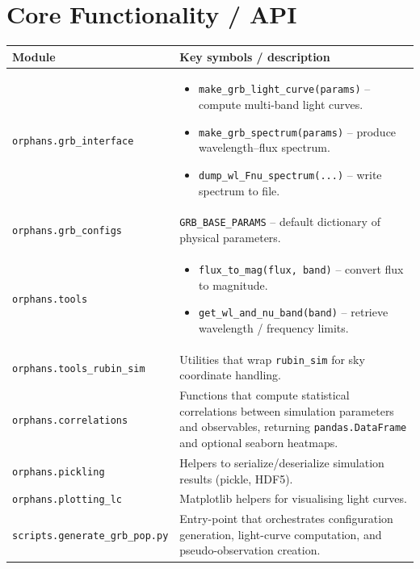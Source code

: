\documentclass{article}
\begin{document}
\section*{Core Functionality / API}
\begin{longtable}{p{}p{}}
\textbf{Module} & \textbf{Key symbols / description} \\ \hline
\texttt{orphans.grb\_interface} &
\begin{itemize}
  \item \texttt{make\_grb\_light\_curve(params)} – compute multi-band light curves.
  \item \texttt{make\_grb\_spectrum(params)} – produce wavelength–flux spectrum.
  \item \texttt{dump\_wl\_Fnu\_spectrum(...)} – write spectrum to file.
\end{itemize} \\
\texttt{orphans.grb\_configs} & \texttt{GRB\_BASE\_PARAMS} – default dictionary of physical parameters. \\
\texttt{orphans.tools} &
\begin{itemize}
  \item \texttt{flux\_to\_mag(flux, band)} – convert flux to magnitude.
  \item \texttt{get\_wl\_and\_nu\_band(band)} – retrieve wavelength / frequency limits.
\end{itemize} \\
\texttt{orphans.tools\_rubin\_sim} & Utilities that wrap \texttt{rubin\_sim} for sky coordinate handling. \\
\texttt{orphans.correlations} & Functions that compute statistical correlations between simulation parameters and observables, returning \texttt{pandas.DataFrame} and optional seaborn heatmaps. \\
\texttt{orphans.pickling} & Helpers to serialize/deserialize simulation results (pickle, HDF5). \\
\texttt{orphans.plotting\_lc} & Matplotlib helpers for visualising light curves. \\
\texttt{scripts.generate\_grb\_pop.py} & Entry-point that orchestrates configuration generation, light-curve computation, and pseudo-observation creation. \\
\end{longtable}
\end{document}
